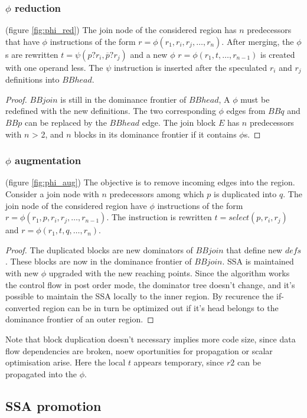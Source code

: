 \subsubsection{$\phi$ reduction} (figure \ref{fig:phi_red})
 The join node of the considered region has $n$ predecessors that have $\phi$ instructions of the form $r=\phi(r_1,r_i,r_j,\dots,r_n)$. After merging, the $\phi$s are rewritten $t=\psi(p?r_i,\overline{p}?r_j)$ and a new $\phi$ $r=\phi(r_1,t,\dots,r_{n-1})$ is created with one operand less. The $\psi$ instruction is inserted after the speculated $r_i$ and $r_j$ definitions into $BBhead$.
\begin{proof} $BBjoin$ is still in the dominance frontier of $BBhead$, A $\phi$ must be redefined with the new definitions. The two corresponding $\phi$ edges from $BBq$ and $BBp$ can be replaced by the $BBhead$ edge.
The join block $E$ has $n$ predecessors with $n$ > 2, and $n$ blocks in its dominance frontier if it contains $\phi$s.
\end{proof}
\subsubsection{$\phi$ augmentation} (figure \ref{fig:phi_aug})
The objective is to remove incoming edges into the region. 
Consider a join node with $n$ predecessors among which $p$ is duplicated into $q$.  The join node of the considered region have $\phi$ instructions of the form $r=\phi(r_1,p,r_i,r_j,\dots,r_{n-1})$. The instruction is rewritten $t=select(p,r_i,r_j)$ and \mbox{$r=\phi(r_1,t,q,\dots,r_n)$}. 
\begin{proof}The duplicated blocks are new dominators of $BBjoin$ that define new $defs$. These blocks are now in the dominance frontier of $BBjoin$. SSA is maintained with new $\phi$ upgraded with the new reaching points.
Since the algorithm works the control flow in post order mode, the dominator tree doesn't change, and it's possible to maintain the SSA locally to the inner region. By recurence the if-converted region can be in turn be optimized out if it's head belongs to the dominance frontier of an outer region.
\end{proof}
Note that block duplication doesn't necessary implies more code size, since data flow dependencies are broken, noew oportunities for propagation or scalar optimisation arise. Here the local $t$ appears temporary, since $r2$ can be propagated into the $\phi$.

\subsection{SSA promotion}


